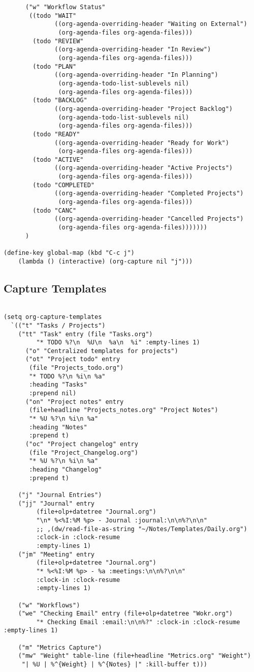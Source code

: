 \documentclass[11pt]{article}
\begin{document}
\begin{verbatim}
      ("w" "Workflow Status"
       ((todo "WAIT"
              ((org-agenda-overriding-header "Waiting on External")
               (org-agenda-files org-agenda-files)))
        (todo "REVIEW"
              ((org-agenda-overriding-header "In Review")
               (org-agenda-files org-agenda-files)))
        (todo "PLAN"
              ((org-agenda-overriding-header "In Planning")
               (org-agenda-todo-list-sublevels nil)
               (org-agenda-files org-agenda-files)))
        (todo "BACKLOG"
              ((org-agenda-overriding-header "Project Backlog")
               (org-agenda-todo-list-sublevels nil)
               (org-agenda-files org-agenda-files)))
        (todo "READY"
              ((org-agenda-overriding-header "Ready for Work")
               (org-agenda-files org-agenda-files)))
        (todo "ACTIVE"
              ((org-agenda-overriding-header "Active Projects")
               (org-agenda-files org-agenda-files)))
        (todo "COMPLETED"
              ((org-agenda-overriding-header "Completed Projects")
               (org-agenda-files org-agenda-files)))
        (todo "CANC"
              ((org-agenda-overriding-header "Cancelled Projects")
               (org-agenda-files org-agenda-files)))))))
      )

(define-key global-map (kbd "C-c j")
    (lambda () (interactive) (org-capture nil "j")))
\end{verbatim}
\subsection{Capture Templates}
\label{sec:org728d7a8}
\begin{verbatim}

(setq org-capture-templates
  `(("t" "Tasks / Projects")
    ("tt" "Task" entry (file "Tasks.org")
         "* TODO %?\n  %U\n  %a\n  %i" :empty-lines 1)
      ("o" "Centralized templates for projects")
      ("ot" "Project todo" entry
       (file "Projects_todo.org")
       "* TODO %?\n %i\n %a"
       :heading "Tasks"
       :prepend nil)
      ("on" "Project notes" entry
       (file+headline "Projects_notes.org" "Project Notes")
       "* %U %?\n %i\n %a"
       :heading "Notes"
       :prepend t)
      ("oc" "Project changelog" entry
       (file "Project_Changelog.org")
       "* %U %?\n %i\n %a"
       :heading "Changelog"
       :prepend t)

    ("j" "Journal Entries")
    ("jj" "Journal" entry
         (file+olp+datetree "Journal.org")
         "\n* %<%I:%M %p> - Journal :journal:\n\n%?\n\n"
         ;; ,(dw/read-file-as-string "~/Notes/Templates/Daily.org")
         :clock-in :clock-resume
         :empty-lines 1)
    ("jm" "Meeting" entry
         (file+olp+datetree "Journal.org")
         "* %<%I:%M %p> - %a :meetings:\n\n%?\n\n"
         :clock-in :clock-resume
         :empty-lines 1)

    ("w" "Workflows")
    ("we" "Checking Email" entry (file+olp+datetree "Wokr.org")
         "* Checking Email :email:\n\n%?" :clock-in :clock-resume :empty-lines 1)

    ("m" "Metrics Capture")
    ("mw" "Weight" table-line (file+headline "Metrics.org" "Weight")
     "| %U | %^{Weight} | %^{Notes} |" :kill-buffer t)))
\end{verbatim}
\end{document}
